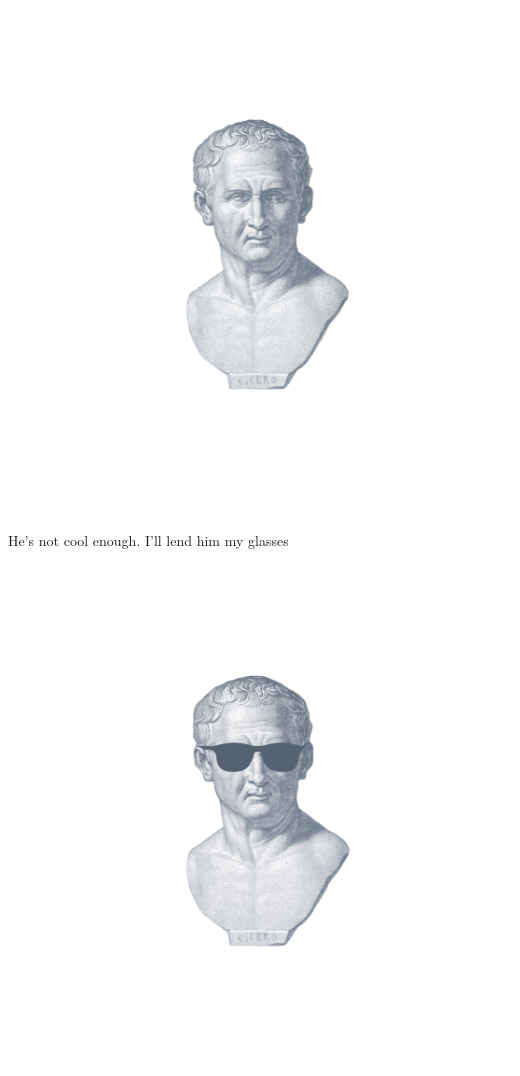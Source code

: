 \documentclass[12pt]{article}
\begin{document}
\begin{center}
\includegraphics[scale=0.5]{images/cicero.png}
\end{center}

He's not cool enough. I'll lend him my glasses

\begin{center}
\includegraphics[scale=0.5]{images/cicero_glasses.png}
\end{center}
\end{document}
